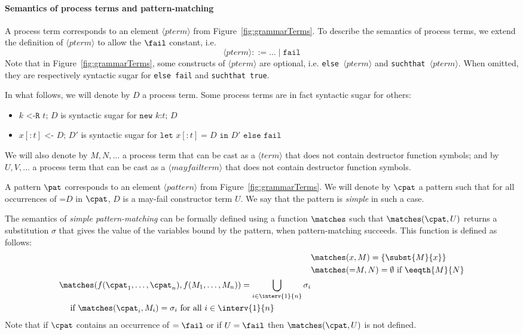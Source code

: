 \documentclass{book}
\newcommand{\nonterm}[1]{\langle\mathit{#1}\rangle}
\begin{document}
\paragraph{Semantics of process terms and pattern-matching}

A process term corresponds to an element $\nonterm{pterm}$ from Figure~\ref{fig:grammarTerms}. To describe the semantics of process terms, we extend the definition of $\nonterm{pterm}$ to allow the $\fail$ constant, i.e.
\[
\nonterm{pterm} ::= \ldots \mid \texttt{fail}
\]
Note that in Figure~\ref{fig:grammarTerms}, some constructs of $\nonterm{pterm}$ are optional, i.e. \texttt{else }$\nonterm{pterm}$ and \texttt{suchthat }$\nonterm{pterm}$. When omitted, they are respectively syntactic sugar for  \texttt{else fail} and \texttt{suchthat true}.

In what follows, we will denote by $D$ a process term. Some process terms are in fact syntactic sugar for others:
\begin{itemize}
\item $k\texttt{ <-R }t\texttt{; }D$ is syntactic sugar for $\texttt{new }k\texttt{:}t \texttt{; }D$
\item $x [:t] \texttt{ <- } D\texttt{; }D'$ is syntactic sugar for $\texttt{let }x [:t] = D\texttt{ in }D'\texttt{ else fail}$
\end{itemize}
We will also denote by $M,N,\ldots$ a process term that can be cast as a $\nonterm{term}$ that does not contain destructor function symbols; and by $U,V,\ldots$ a process term that can be cast as a $\nonterm{mayfailterm}$ that does not contain destructor function symbols.

A pattern $\pat$ corresponds to an element $\nonterm{pattern}$ from Figure~\ref{fig:grammarTerms}. We will denote by $\cpat$ a pattern such that for all occurrences of $\texttt{=}D$ in $\cpat$, $D$ is a may-fail constructor term $U$. We say that the pattern is \emph{simple} in such a case.

The semantics of \emph{simple pattern-matching} can be formally defined using a function $\matches$ such that $\matches(\cpat, U)$ returns a substitution $\sigma$ that gives the value of the variables bound by the pattern, when pattern-matching succeeds. This function is defined as follows:
\begin{align*}
&\matches(x,M) = \{\subst{M}{x}\}\\
&\matches({=}M, N) = \emptyset\text{ if $\eeqth{M}{N}$}\\
\begin{split}
&\matches(f(\cpat_1, \ldots, \cpat_n), f(M_1, \ldots, M_n)) = \bigcup_{i \in \interv{1}{n}} \sigma_i \\
&\quad\text{ if $\matches(\cpat_i, M_i) = \sigma_i$ for all $i \in \interv{1}{n}$}
\end{split}
\end{align*}
Note that if $\cpat$ contains an occurrence of $=\fail$ or if $U = \fail$ then $\matches(\cpat,U)$ is not defined.
\end{document}
